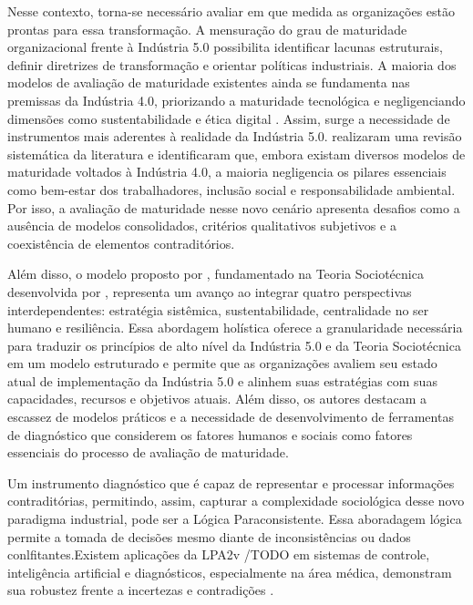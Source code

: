 Nesse contexto, torna-se necessário avaliar em que medida as organizações estão prontas para essa transformação. A mensuração do grau de maturidade organizacional frente à Indústria 5.0 possibilita identificar lacunas estruturais, definir diretrizes de transformação e orientar políticas industriais. A maioria dos modelos de avaliação de maturidade existentes ainda se fundamenta nas premissas da Indústria 4.0, priorizando a maturidade tecnológica e negligenciando dimensões como sustentabilidade e ética digital \cite{Lucato2019,HeinPensel2023}. Assim, surge a necessidade de instrumentos mais aderentes à realidade da Indústria 5.0.  realizaram uma revisão sistemática da literatura e identificaram que, embora existam diversos modelos de maturidade voltados à Indústria 4.0, a maioria negligencia os pilares essenciais como bem-estar dos trabalhadores, inclusão social e responsabilidade ambiental. Por isso, a avaliação de maturidade nesse novo cenário apresenta desafios como a ausência de modelos consolidados, critérios qualitativos subjetivos e a coexistência de elementos contraditórios.

Além disso, o modelo proposto por , fundamentado na Teoria Sociotécnica desenvolvida por , representa um avanço ao integrar quatro perspectivas interdependentes: estratégia sistêmica, sustentabilidade, centralidade no ser humano e resiliência. Essa abordagem holística oferece a granularidade necessária para traduzir os princípios de alto nível da Indústria 5.0 e da Teoria Sociotécnica em um modelo estruturado e permite que as organizações avaliem seu estado atual de implementação da Indústria 5.0 e alinhem suas estratégias com suas capacidades, recursos e objetivos atuais. Além disso, os autores destacam a escassez de modelos práticos e a necessidade de desenvolvimento de ferramentas de diagnóstico que considerem os fatores humanos e sociais como fatores essenciais do processo de avaliação de maturidade.

Um instrumento diagnóstico que é capaz de representar e processar informações contraditórias, permitindo, assim, capturar a complexidade sociológica desse novo paradigma industrial, pode ser a Lógica Paraconsistente. Essa aboradagem lógica permite a tomada de decisões mesmo diante de inconsistências ou dados conlfitantes.Existem aplicações da LPA2v /TODO em sistemas de controle, inteligência artificial e diagnósticos, especialmente na área médica, demonstram sua robustez frente a incertezas e contradições \cite{SilvaFilho1999, CarvalhoBrunsteinAbe2003, CarvalhoJunior2024}.

